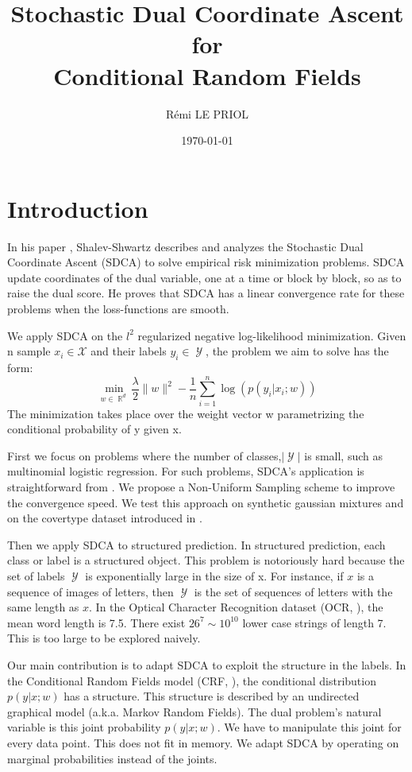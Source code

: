 \documentclass{article}
\title{Stochastic Dual Coordinate Ascent \\ for \\ Conditional Random Fields}
\author{R\'emi LE PRIOL}
\date{\today}
\DeclareMathOperator{\R}{\mathbb{R}}
\DeclareMathOperator{\1}{\mathbb{1}}
\DeclareMathOperator{\Y}{\mathcal{Y}}
\begin{document}
\maketitle

\section*{Introduction}
In his paper \cite{shalev-shwartz_accelerated_2013-1}, Shalev-Shwartz describes and analyzes the Stochastic Dual Coordinate Ascent (SDCA) to solve empirical risk minimization problems.
SDCA update coordinates of the dual variable, one at a time or block by block, so as to raise the dual score.
He proves that SDCA has a linear convergence rate for these problems when the loss-functions are smooth.

We apply SDCA on the $l^2$ regularized negative log-likelihood minimization.
Given n sample $x_i \in \mathcal X$ and their labels $y_i \in \Y$, the problem we aim to solve has the form:
\begin{equation}
	\label{max likelihood}
	 \min_{w \in \R^d} \frac{\lambda}{2}\|w\|^2 - \frac{1}{n}   \sum_{i=1}^{n} \log(p(y_i|x_i; w))
\end{equation}
The minimization takes place over the weight vector w parametrizing the conditional probability of y given x. 
  
First we focus on problems where the number of classes,$|\Y|$ is small, such as multinomial logistic regression.
For such problems, SDCA's application is straightforward from \cite{shalev-shwartz_accelerated_2013-1}.
We propose a Non-Uniform Sampling scheme to improve the convergence speed.
We test this approach on synthetic gaussian mixtures and on the covertype dataset introduced in \cite{blackard_comparative_1999}.
 
Then we apply SDCA to structured prediction.
In structured prediction, each class or label is a structured object.
This problem is notoriously hard because the set of labels $\Y$ is exponentially large in the size of x.
For instance, if $x$ is a sequence of images of letters, then $\Y$ is the set of sequences of  letters with the same length as $x$.
In the Optical Character Recognition dataset (OCR, \cite{taskar_max-margin_2004}), the mean word length is 7.5.
There exist $26^7 \sim 10^{10}$ lower case strings of length 7.
This is too large to be explored naively.

Our main contribution is to adapt SDCA to exploit the structure in the labels.
In the Conditional Random Fields model (CRF, \cite{lafferty_conditional_2001} ), the conditional distribution $p(y|x ; w)$ has a structure.
This structure is described by an undirected graphical model (a.k.a. Markov Random Fields). 
The dual problem's natural variable is this joint probability $p(y|x ; w)$.
We have to manipulate this joint for every data point.
This does not fit in memory.
We adapt SDCA by operating on marginal probabilities instead of the joints.
\end{document}
